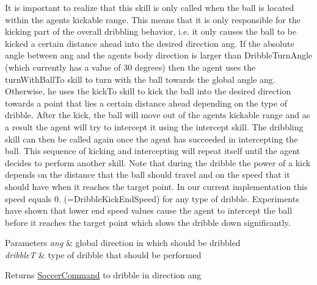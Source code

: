 It is important to realize that this skill is only called when the ball is located within the agent\textquotesingle{}s kickable range. This means that it is only responsible for the kicking part of the overall dribbling behavior, i.\+e. it only causes the ball to be kicked a certain distance ahead into the desired direction \textquotesingle{}ang\textquotesingle{}. If the absolute angle between \textquotesingle{}ang\textquotesingle{} and the agent\textquotesingle{}s body direction is larger than Dribble\+Turn\+Angle (which currently has a value of 30 degrees) then the agent uses the turn\+With\+Ball\+To skill to turn with the ball towards the global angle \textquotesingle{}ang\textquotesingle{}. Otherwise, he uses the kick\+To skill to kick the ball into the desired direction towards a point that lies a certain distance ahead depending on the type of dribble. After the kick, the ball will move out of the agent\textquotesingle{}s kickable range and as a result the agent will try to intercept it using the intercept skill. The dribbling skill can then be called again once the agent has succeeded in intercepting the ball. This sequence of kicking and intercepting will repeat itself until the agent decides to perform another skill. Note that during the dribble the power of a kick depends on the distance that the ball should travel and on the speed that it should have when it reaches the target point. In our current implementation this speed equals 0. (=Dribble\+Kick\+End\+Speed) for any type of dribble. Experiments have shown that lower end speed values cause the agent to intercept the ball before it reaches the target point which slows the dribble down significantly.


\begin{DoxyParams}{Parameters}
{\em ang} & global direction in which should be dribbled \\
\hline
{\em dribbleT} & type of dribble that should be performed \\
\hline
\end{DoxyParams}
\begin{DoxyReturn}{Returns}
\hyperlink{classSoccerCommand}{Soccer\+Command} to dribble in direction \textquotesingle{}ang\textquotesingle{} 
\end{DoxyReturn}
